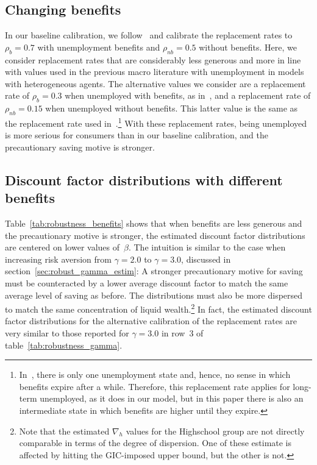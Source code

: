 \documentclass[\latexroot/\projectname]{subfiles}
\begin{document}
\hypertarget{changing-benefits}{}\subsection*{Changing benefits}
\whenintegrated{\label{sec:robust_benefits}} 

In our baseline calibration, we follow~\cite{rothstein2017scraping} and calibrate the replacement rates to $\rho_b=0.7$ with unemployment benefits and $\rho_{nb}=0.5$ without benefits.
Here, we consider replacement rates that are considerably less generous and more in line with values used in the previous macro literature with unemployment in models with heterogeneous agents.
The alternative values we consider are a replacement rate of $\rho_{b}=0.3$ when unemployed with benefits, as in~\cite{carroll2020modeling}, and a replacement rate of $\rho_{nb}=0.15$ when unemployed without benefits.
This latter value is the same as the replacement rate used in~\cite{den2010computational}.\footnote{In~\cite{den2010computational}, there is only one unemployment state and, hence, no sense in which benefits expire after a while.
  Therefore, this replacement rate applies for long-term unemployed, as it does in our model, but in this paper there is also an intermediate state in which benefits are higher until they expire.} With these replacement rates, being unemployed is more serious for consumers than in our baseline calibration, and the precautionary saving motive is stronger.

\subsection*{Discount factor distributions with different benefits}
\whenintegrated{\label{sec:robust_benefits_estim}} 

Table~\ref{tab:robustness_benefits} shows that when benefits are less generous and the precautionary motive is stronger, the estimated discount factor distributions are centered on lower values of~$\beta$.
The intuition is similar to the case when increasing risk aversion from $\gamma=2.0$ to $\gamma=3.0$, discussed in section~\ref{sec:robust_gamma_estim}: A stronger precautionary motive for saving must be counteracted by a lower average discount factor to match the same average level of saving as before.
The distributions must also be more dispersed to match the same concentration of liquid wealth.\footnote{Note that the estimated $\nabla_h$ values for the Highschool group are not directly comparable in terms of the degree of dispersion.
  One of these estimate is affected by hitting the GIC-imposed upper bound, but the other is not.} In fact, the estimated discount factor distributions for the alternative calibration of the replacement rates are very similar to those reported for $\gamma=3.0$ in row~3 of table~\ref{tab:robustness_gamma}.
\end{document}
